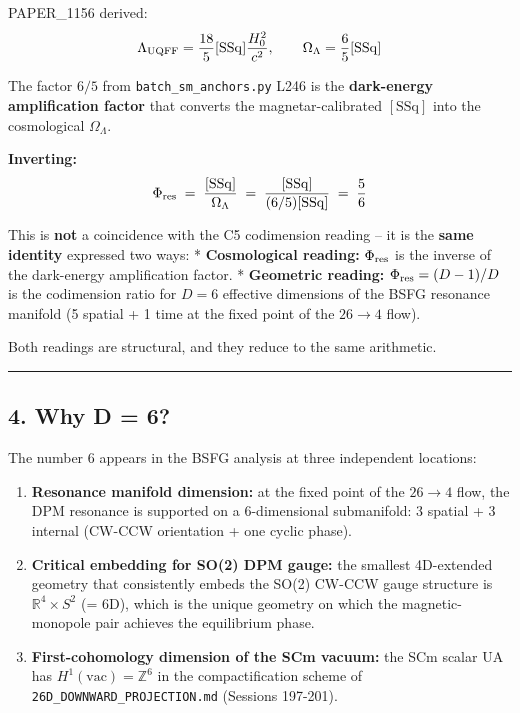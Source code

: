 \documentclass[
]{article}
\begin{document}
PAPER\_1156 derived:
\[\Lambda_{\rm UQFF} = \frac{18}{5} [\mathrm{SSq}] \frac{H_0^2}{c^2}, \qquad \Omega_\Lambda = \frac{6}{5} [\mathrm{SSq}]\]

The factor \(6/5\) from \texttt{batch\_sm\_anchors.py} L246 is the
\textbf{dark-energy amplification factor} that converts the
magnetar-calibrated \([\mathrm{SSq}]\) into the cosmological
\(\Omega_\Lambda\).

\textbf{Inverting:}
\[\Phi_{\rm res} \;=\; \frac{[\mathrm{SSq}]}{\Omega_\Lambda} \;=\; \frac{[\mathrm{SSq}]}{(6/5)[\mathrm{SSq}]} \;=\; \frac{5}{6}\]

This is \textbf{not} a coincidence with the C5 codimension reading -- it
is the \textbf{same identity} expressed two ways: * \textbf{Cosmological
reading:} \(\Phi_{\rm res}\) is the inverse of the dark-energy
amplification factor. * \textbf{Geometric reading:}
\(\Phi_{\rm res} = (D-1)/D\) is the codimension ratio for \(D = 6\)
effective dimensions of the BSFG resonance manifold (5 spatial + 1 time
at the fixed point of the \(26 \to 4\) flow).

Both readings are structural, and they reduce to the same arithmetic.

\begin{center}\rule{0.5\linewidth}{0.5pt}\end{center}

\subsection{4. Why D = 6?}\label{why-d-6}

The number 6 appears in the BSFG analysis at three independent
locations:

\begin{enumerate}
\def\labelenumi{\arabic{enumi}.}
\item
  \textbf{Resonance manifold dimension:} at the fixed point of the
  \(26 \to 4\) flow, the DPM resonance is supported on a 6-dimensional
  submanifold: 3 spatial + 3 internal (CW-CCW orientation + one cyclic
  phase).
\item
  \textbf{Critical embedding for SO(2) DPM gauge:} the smallest
  4D-extended geometry that consistently embeds the SO(2) CW-CCW gauge
  structure is \(\mathbb{R}^{4} \times S^{2}\) (= 6D), which is the
  unique geometry on which the magnetic-monopole pair achieves the
  equilibrium phase.
\item
  \textbf{First-cohomology dimension of the SCm vacuum:} the SCm scalar
  \(\mathrm{UA}\) has \(H^1(\text{vac}) = \mathbb{Z}^6\) in the
  compactification scheme of \texttt{26D\_DOWNWARD\_PROJECTION.md}
  (Sessions 197-201).
\end{enumerate}
\end{document}
